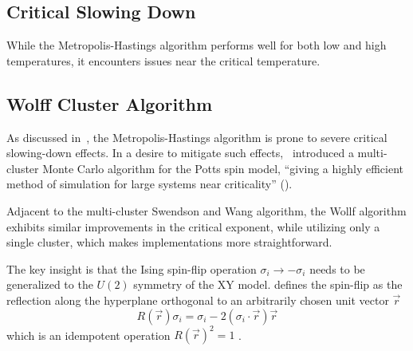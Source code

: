 	\subsection{Critical Slowing Down}\label{sec:theo:critical_slowing_down}
		While the Metropolis-Hastings algorithm performs well for both low and high temperatures, it encounters issues near the critical temperature.
		
	\subsection{Wolff Cluster Algorithm}\label{sec:theo:wolff_cluster}
		As discussed in~, the Metropolis-Hastings algorithm is prone to severe critical slowing-down effects. In a desire to mitigate such effects,~\cite{sw} introduced a multi-cluster Monte Carlo algorithm for the Potts spin model, \enquote{giving a highly efficient method of simulation for large systems near criticality} (\cite{sw}).
		
		Adjacent to the multi-cluster Swendson and Wang algorithm, the Wollf algorithm exhibits similar improvements in the critical exponent, while utilizing only a single cluster, which makes implementations more straightforward.
		
		The key insight is that the Ising spin-flip operation $\sigma_i \rightarrow -\sigma_i$ needs to be generalized to the $U(2)$ symmetry of the XY model. \cite{wolff} defines the spin-flip as the reflection along the hyperplane orthogonal to an arbitrarily chosen unit vector $\vec{r}$
		\begin{equation}
			R(\vec{r}) \sigma_i = \sigma_i - 2 (\sigma_i \cdot \vec{r}) \vec{r} 
		\end{equation}
		which is an idempotent operation $R(\vec{r})^2=1$ \cite[eq. 3]{wolff}.
	
